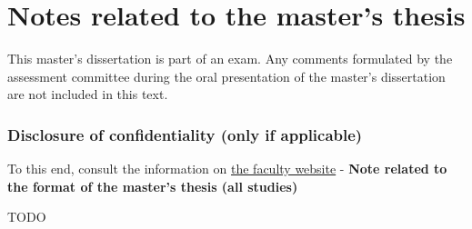 \chapter*{Notes related to the master's thesis}

This master's dissertation is part of an exam. Any comments formulated by the assessment committee during the oral presentation of the master's dissertation are not included in this text.

\subsection*{Disclosure of confidentiality (only if applicable)}

To this end, consult the information on \href{https://www.ugent.be/ea/nl/faculteit/studentenadministratie/masterproef/} {the faculty website} - \textbf{Note related to the format of the master's thesis (all studies)}

TODO